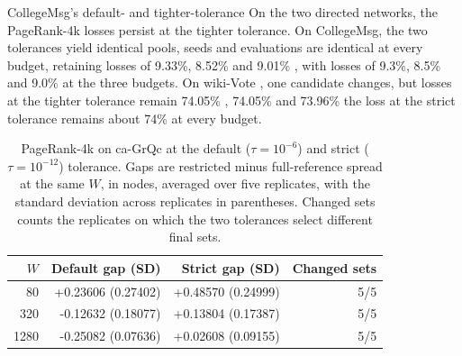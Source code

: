 \documentclass[smallextended]{svjour3}
\providecommand{\DIFaddtex}[1]{{\protect\color{blue} \sf #1}} %
\providecommand{\DIFdeltex}[1]{{\protect\color{red} \scriptsize #1}} %
\providecommand{\DIFaddbegin}{} %
\providecommand{\DIFaddend}{} %
\providecommand{\DIFdelbegin}{} %
\providecommand{\DIFdelend}{} %
\providecommand{\DIFadd}[1]{\texorpdfstring{\DIFaddtex{#1}}{#1}} %
\providecommand{\DIFdel}[1]{\texorpdfstring{\DIFdeltex{#1}}{}} %
\providecommand{\DIFscaledelfig}{0.5}
\newlength{\DIFdelgraphicswidth} %
\newlength{\DIFdelgraphicsheight} %
\providecommand{\DIFaddincludegraphics}[2][]{{\color{blue}\fbox{\DIFOincludegraphics[#1]{#2}}}} %
\providecommand{\DIFdelincludegraphics}[2][]{%
\sbox{\DIFdelgraphicsbox}{\DIFOincludegraphics[#1]{#2}}%
\settoboxwidth{\DIFdelgraphicswidth}{\DIFdelgraphicsbox} %
\settoboxtotalheight{\DIFdelgraphicsheight}{\DIFdelgraphicsbox} %
\scalebox{\DIFscaledelfig}{%
\parbox[b]{\DIFdelgraphicswidth}{\usebox{\DIFdelgraphicsbox}\\[-\baselineskip] \rule{\DIFdelgraphicswidth}{0em}}\llap{\resizebox{\DIFdelgraphicswidth}{\DIFdelgraphicsheight}{%
\setlength{\unitlength}{\DIFdelgraphicswidth}%
\begin{picture}(1,1)%
\thicklines\linethickness{2pt} %
{\color[rgb]{1,0,0}\put(0,0){\framebox(1,1){}}}%
{\color[rgb]{1,0,0}\put(0,0){\line( 1,1){1}}}%
{\color[rgb]{1,0,0}\put(0,1){\line(1,-1){1}}}%
\end{picture}%
}\hspace*{3pt}}} %
} %
\DeclareRobustCommand{\DIFaddbegin}{\DIFOaddbegin \let\includegraphics\DIFaddincludegraphics} %
\DeclareRobustCommand{\DIFaddend}{\DIFOaddend \let\includegraphics\DIFOincludegraphics} %
\DeclareRobustCommand{\DIFdelbegin}{\DIFOdelbegin \let\includegraphics\DIFdelincludegraphics} %
\DeclareRobustCommand{\DIFdelend}{\DIFOaddend \let\includegraphics\DIFOincludegraphics} %
\begin{document}
\DIFdelbegin \DIFdel{CollegeMsg's default- and tighter-tolerance }\DIFdelend \DIFaddbegin \DIFadd{On the two directed networks, the PageRank-4k losses persist at the tighter tolerance. On CollegeMsg, the two tolerances yield identical }\DIFaddend pools, seeds and evaluations\DIFdelbegin \DIFdel{are identical at every budget, retaining losses of 9.33\%, 8.52\% and 9.01\% }\DIFdelend \DIFaddbegin \DIFadd{, with losses of 9.3\%, 8.5\% and 9.0\% at the three budgets}\DIFaddend . On wiki-Vote \DIFdelbegin \DIFdel{, }\DIFdelend one candidate changes, but \DIFdelbegin \DIFdel{losses at the tighter tolerance remain 74.05\% , 74.05\% and 73.96\%}\DIFdelend \DIFaddbegin \DIFadd{the loss at the strict tolerance remains about 74\% at every budget}\DIFaddend .

\begin{table}[htbp]
\caption{PageRank-4k on ca-GrQc at the default ($\tau=10^{-6}$) and strict ($\tau=10^{-12}$) tolerance. Gaps are restricted minus full-reference spread at the same $W$, in nodes, averaged over five replicates, with the standard deviation across replicates in parentheses. Changed sets counts the replicates on which the two tolerances select different final sets.}\label{tab:precision-output}
\centering\begin{tabular}{rrrr}\toprule
$W$ & Default gap (SD) & Strict gap (SD) & Changed sets \\ \midrule
80 & +0.23606 (0.27402) & +0.48570 (0.24999) & 5/5 \\
320 & -0.12632 (0.18077) & +0.13804 (0.17387) & 5/5 \\
1280 & -0.25082 (0.07636) & +0.02608 (0.09155) & 5/5 \\
\bottomrule\end{tabular}
\end{table}
\end{document}
